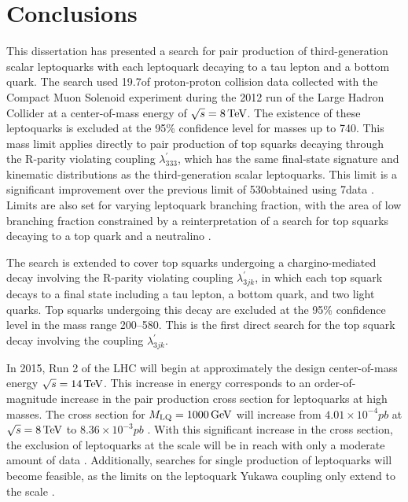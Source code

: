 \documentclass[12pt]{thesis}  %
\newcommand{\MLQ}{\ensuremath{M_{\text{LQ}}}\xspace}
\begin{document}
\chapter{Conclusions
\label{ch:conclusions}}

This dissertation has presented a search for pair production of third-generation scalar leptoquarks with each leptoquark decaying to a tau lepton and a bottom quark. The search used 19.7\fbinv of proton-proton collision data collected with the Compact Muon Solenoid experiment during the 2012 run of the Large Hadron Collider at a center-of-mass energy of $\sqrt{s}=8\,\text{Te\hspace{-.08em}V}$. The existence of these leptoquarks is excluded at the 95\% confidence level for masses up to 740\GeV. This mass limit applies directly to pair production of top squarks decaying through the R-parity violating coupling $\lambda^{\prime}_{333}$, which has the same final-state signature and kinematic distributions as the third-generation scalar leptoquarks. This limit is a significant improvement over the previous limit of 530\GeV obtained using 7\TeV data \cite{CMSLQ3,ATLASLQ3}. Limits are also set for varying leptoquark branching fraction, with the area of low branching fraction constrained by a reinterpretation of a search for top squarks decaying to a top quark and a neutralino \cite{SUS-13-011}. 

The search is extended to cover top squarks undergoing a chargino-mediated decay involving the R-parity violating coupling $\lambda^{\prime}_{3jk}$, in which each top squark decays to a final state including a tau lepton, a bottom quark, and two light quarks. Top squarks undergoing this decay are excluded at the 95\% confidence level in the mass range 200--580\GeV. This is the first direct search for the top squark decay involving the coupling $\lambda^{\prime}_{3jk}$.

In 2015, Run 2 of the LHC will begin at approximately the design center-of-mass energy $\sqrt{s}=14\,\text{Te\hspace{-.08em}V}$. This increase in energy corresponds to an order-of-magnitude increase in the pair production cross section for leptoquarks at high masses. The cross section for $\MLQ=1000\GeV$ will increase from $4.01\times10^{-4}\unit{pb}$ at $\sqrt{s}=8\,\text{Te\hspace{-.08em}V}$ to $8.36\times10^{-3}\unit{pb}$ \cite{LQxsec}. With this significant increase in the cross section, the exclusion of leptoquarks at the \TeVns scale will be in reach with only a moderate amount of data \cite{LQPairHad}. Additionally, searches for single production of leptoquarks will become feasible, as the limits on the leptoquark Yukawa coupling only extend to the \TeVns scale \cite{Leurer:1993em, MuchAdo, LQreview}.
\end{document}
